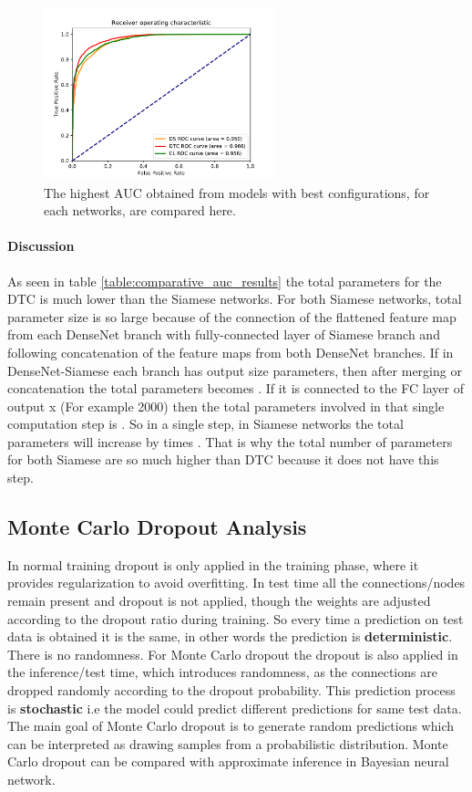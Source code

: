 \begin{figure}[ht]
\centering
\includegraphics[height= 5cm]{images/densenet/final_auc_compare}
\caption{The highest AUC obtained from models with best configurations, for each networks, are compared here.}
\label{fig:final_auc_compare}
\end{figure}

\paragraph{Discussion }
As seen in table \ref{table:comparative_auc_results} the total parameters for the DTC is much lower than the Siamese networks. For both Siamese networks, total parameter size is so large because of the connection of the flattened 
feature map from each DenseNet branch with fully-connected layer of Siamese branch and following concatenation of the feature maps from both DenseNet branches. If in DenseNet-Siamese each branch has output size  parameters, 
then after merging or concatenation the total parameters becomes . If it is connected to the FC layer of output x (For example 2000) then the total parameters involved in that single computation step is . 
So in a single step, in Siamese networks the total parameters will increase by  times . 
That is why the total number of parameters for both Siamese are so much higher than DTC because it does not have this step.
\newpage
\subsection{Monte Carlo Dropout Analysis}
In normal training dropout is only applied in the training phase, where it provides regularization to avoid overfitting. In test time all the connections/nodes remain present and dropout is not applied, though the weights are adjusted 
according to the dropout ratio during training. So every time a prediction on test data is obtained it is the same, in other words the prediction is \textbf{deterministic}. There is no randomness.
For Monte Carlo dropout the dropout 
is also applied in the inference/test time, which introduces randomness, as the connections are dropped randomly according to the dropout probability. This prediction process is \textbf{stochastic} i.e the model could predict 
different predictions for same test data. The main goal of Monte Carlo dropout \cite{Gal2015DropoutB} is to generate random predictions which can be interpreted as drawing samples from a probabilistic distribution. Monte Carlo dropout can be
compared with approximate inference in Bayesian neural network.

